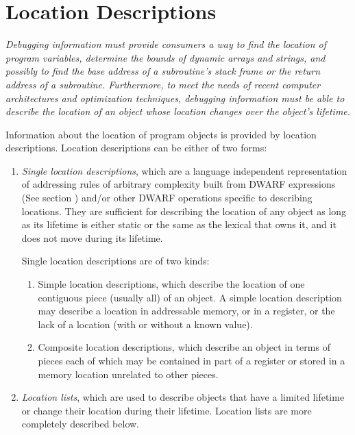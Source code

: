 \section{Location Descriptions}
\label{chap:locationdescriptions}
\textit{ Debugging information must provide consumers a way to find
the location of program variables, determine the bounds
of dynamic arrays and strings, and possibly to find the
base address of a subroutine’s stack frame or the return
address of a subroutine. Furthermore, to meet the needs of
recent computer architectures and optimization techniques,
debugging information must be able to describe the location of
an object whose location changes over the object’s lifetime.}

Information about the location of program objects is provided
by location descriptions. Location descriptions can be either
of two forms:
\begin{enumerate}[1]
\item \textit{Single location descriptions}, which are a language independent representation of
addressing rules of arbitrary complexity built from 
DWARF expressions (See section ) 
and/or other
DWARF operations specific to describing locations. They are
sufficient for describing the location of any object as long
as its lifetime is either static or the same as the lexical
 that owns it, 
and it does not move during its lifetime.

Single location descriptions are of two kinds:
\begin{enumerate}[a]
\item Simple location descriptions, which describe the location
of one contiguous piece (usually all) of an object. A simple
location description may describe a location in addressable
memory, or in a register, or the lack of a location (with or
without a known value).

\item  Composite location descriptions, which describe an
object in terms of pieces each of which may be contained in
part of a register or stored in a memory location unrelated
to other pieces.

\end{enumerate}
\item \textit{Location lists}, which are used to describe
objects that have a limited lifetime or change their location
during their lifetime. Location lists are more completely
described below.

\end{enumerate}

